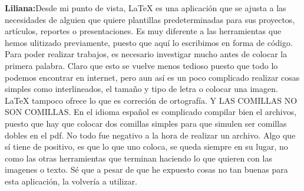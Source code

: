 \documentclass[12pt]{report}
\begin{document}
\textbf{Liliana:\newline\newline}Desde mi punto de vista, LaTeX es una aplicación que se ajusta a las necesidades de alguien que quiere plantillas predeterminadas para sus proyectos, artículos, reportes o presentaciones. Es muy diferente a las herramientas que hemos ulitizado previamente, puesto que aquí lo escribimos en forma de código.
\newline
\newline
Para poder realizar trabajos, es necesario investigar mucho antes de colocar la primera palabra. Claro que esto se vuelve menos tedioso puesto que todo lo podemos encontrar en internet, pero aun así es un poco complicado realizar cosas simples como interlineados, el tamaño y tipo de letra o colocar una imagen.
\newline
\newline
LaTeX tampoco ofrece lo que es correción de ortografía. Y LAS COMILLAS NO SON COMILLAS. En el idioma español es complicado compilar bien el archivos, puesto que hay que colocar dos comillas simples para que simulen ser comillas dobles en el pdf.
\newline
\newline
No todo fue negativo a la hora de realizar un archivo. Algo que sí tiene de positivo, es que lo que uno coloca, se queda siempre en su lugar, no como las otras herramientas que terminan haciendo lo que quieren con las imagenes o texto.
\newline
\newline
Sé que a pesar de que he expuesto cosas no tan buenas para esta aplicación, la volvería a utilizar.
\newline
\newline
\end{document}
